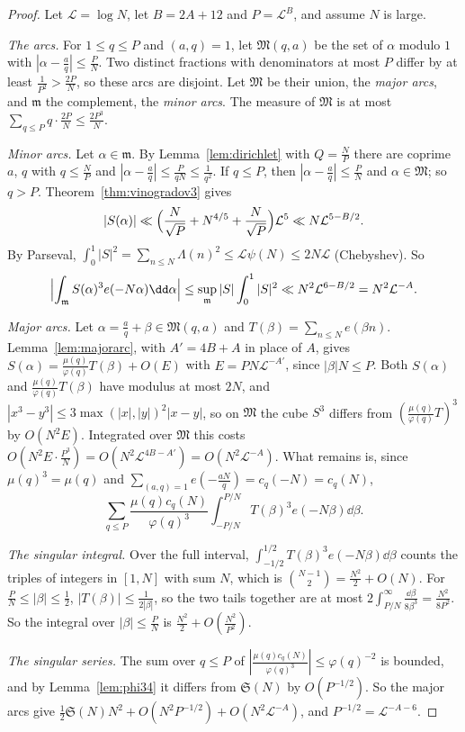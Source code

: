 \begin{proof}
Let $\mathcal L=\log N$, let $B=2A+12$ and $P=\mathcal L^B$, and assume $N$ is large.

\emph{The arcs.} For $1\le q\le P$ and $(a,q)=1$, let $\mathfrak M(q,a)$ be the set of $\alpha$ modulo $1$ with $|\alpha-\frac aq|\le\frac PN$. Two distinct fractions with denominators at most $P$ differ by at least $\frac1{P^2}>\frac{2P}N$, so these arcs are disjoint. Let $\mathfrak M$ be their union, the \emph{major arcs}, and $\mathfrak m$ the complement, the \emph{minor arcs}. The measure of $\mathfrak M$ is at most $\sum_{q\le P}q\cdot\frac{2P}N\le\frac{2P^3}N$.

\emph{Minor arcs.} Let $\alpha\in\mathfrak m$. By Lemma~\ref{lem:dirichlet} with $Q=\frac NP$ there are coprime $a$, $q$ with $q\le\frac NP$ and $|\alpha-\frac aq|\le\frac P{qN}\le\frac1{q^2}$. If $q\le P$, then $|\alpha-\frac aq|\le\frac PN$ and $\alpha\in\mathfrak M$; so $q>P$. Theorem~\ref{thm:vinogradov3} gives
\[
|S(\alpha)|\ll\Bigl(\frac N{\sqrt P}+N^{4/5}+\frac N{\sqrt P}\Bigr)\mathcal L^5\ll N\mathcal L^{5-B/2}.
\]
By Parseval, $\int_0^1|S|^2=\sum_{n\le N}\Lambda(n)^2\le\mathcal L\psi(N)\le2N\mathcal L$ (Chebyshev). So
\[
\Bigl|\int_{\mathfrak m}S(\alpha)^3e(-N\alpha)\dd\alpha\Bigr|\le\sup_{\mathfrak m}|S|\int_0^1|S|^2\ll N^2\mathcal L^{6-B/2}=N^2\mathcal L^{-A}.
\]

\emph{Major arcs.} Let $\alpha=\frac aq+\beta\in\mathfrak M(q,a)$ and $T(\beta)=\sum_{n\le N}e(\beta n)$. Lemma~\ref{lem:majorarc}, with $A'=4B+A$ in place of $A$, gives $S(\alpha)=\frac{\mu(q)}{\varphi(q)}T(\beta)+O(E)$ with $E=PN\mathcal L^{-A'}$, since $|\beta|N\le P$. Both $S(\alpha)$ and $\frac{\mu(q)}{\varphi(q)}T(\beta)$ have modulus at most $2N$, and $|x^3-y^3|\le3\max(|x|,|y|)^2|x-y|$, so on $\mathfrak M$ the cube $S^3$ differs from $(\frac{\mu(q)}{\varphi(q)}T)^3$ by $O(N^2E)$. Integrated over $\mathfrak M$ this costs $O(N^2E\cdot\frac{P^3}N)=O(N^2\mathcal L^{4B-A'})=O(N^2\mathcal L^{-A})$. What remains is, since $\mu(q)^3=\mu(q)$ and $\sum_{(a,q)=1}e(-\frac{aN}q)=c_q(-N)=c_q(N)$,
\[
\sum_{q\le P}\frac{\mu(q)c_q(N)}{\varphi(q)^3}\int_{-P/N}^{P/N}T(\beta)^3e(-N\beta)\dd\beta.
\]

\emph{The singular integral.} Over the full interval, $\int_{-1/2}^{1/2}T(\beta)^3e(-N\beta)\dd\beta$ counts the triples of integers in $[1,N]$ with sum $N$, which is $\binom{N-1}2=\frac{N^2}2+O(N)$. For $\frac PN\le|\beta|\le\frac12$, $|T(\beta)|\le\frac1{2|\beta|}$, so the two tails together are at most $2\int_{P/N}^\infty\frac{\dd\beta}{8\beta^3}=\frac{N^2}{8P^2}$. So the integral over $|\beta|\le\frac PN$ is $\frac{N^2}2+O(\frac{N^2}{P^2})$.

\emph{The singular series.} The sum over $q\le P$ of $|\frac{\mu(q)c_q(N)}{\varphi(q)^3}|\le\varphi(q)^{-2}$ is bounded, and by Lemma~\ref{lem:phi34} it differs from $\mathfrak S(N)$ by $O(P^{-1/2})$. So the major arcs give $\frac12\mathfrak S(N)N^2+O(N^2P^{-1/2})+O(N^2\mathcal L^{-A})$, and $P^{-1/2}=\mathcal L^{-A-6}$.
\end{proof}

